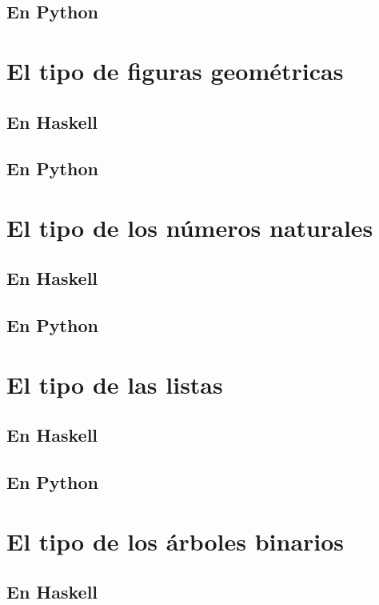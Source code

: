 \documentclass[a4paper,12pt,twoside]{book}
\begin{document}
\subsection*{En Python}

\section{El tipo de figuras geométricas}
\subsection*{En Haskell}
\subsection*{En Python}

\section{El tipo de los números naturales}
\subsection*{En Haskell}
\subsection*{En Python}

\section{El tipo de las listas}
\subsection*{En Haskell}
\subsection*{En Python}

\section{El tipo de los árboles binarios}
\subsection*{En Haskell}
\end{document}
